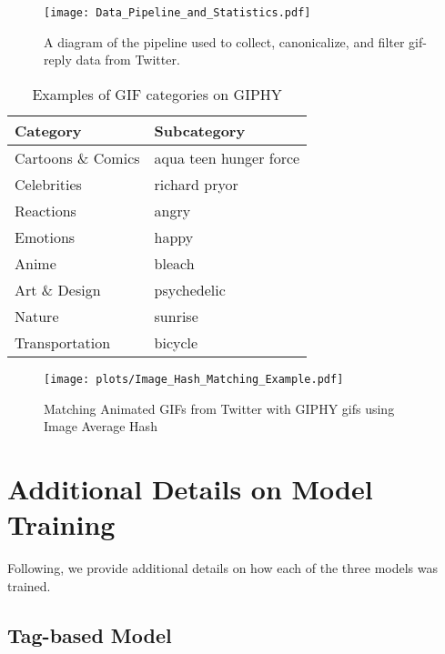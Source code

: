 
\begin{figure*} 
\begin{center} 
\texttt{[image: Data\_Pipeline\_and\_Statistics.pdf]}
\caption{A diagram of the pipeline used to collect, canonicalize, and filter gif-reply data from Twitter.}
\label{fig:data-pipeline}
\end{center}
\end{figure*}


\begin{table}[tb]
    \begin{tabular}{ll}
    \toprule \hline
    \textbf{Category} & \textbf{Subcategory} \\ \hline
    \midrule
        Cartoons \& Comics & aqua teen hunger force \\ 
        Celebrities &           richard pryor \\
        Reactions &             angry \\
        Emotions &              happy \\
        Anime &                 bleach \\
        Art \& Design &         psychedelic \\
        Nature &                sunrise \\
        Transportation &        bicycle \\  \hline
    \bottomrule
    \end{tabular}
    \caption{Examples of GIF categories on GIPHY}
    \label{table:GifCategoryExample}
\end{table}

\begin{figure*} 
\centering
\texttt{[image: plots/Image\_Hash\_Matching\_Example.pdf]}
\caption{Matching Animated GIFs from Twitter with GIPHY gifs using Image Average Hash}
\label{fig:AverageHashExample}
\end{figure*}

\section{Additional Details on Model Training}
\label{app:model-training}

Following, we provide additional details on how each of the three models was trained.

\subsection{Tag-based Model}

